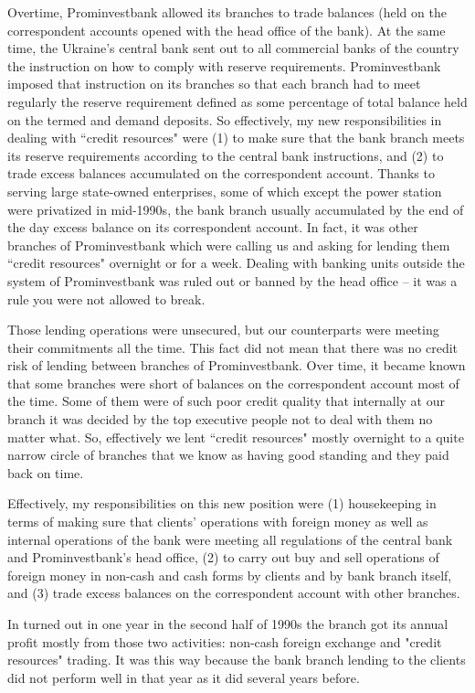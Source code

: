 Overtime, Prominvestbank allowed its branches to trade balances (held on the correspondent accounts opened with the head office of the bank). At the same time, the Ukraine's central bank sent out to all commercial banks of the country the instruction on how to comply with reserve requirements. Prominvestbank imposed that instruction on its branches so that each branch had to meet regularly the reserve requirement defined as some percentage of total balance held on the termed and demand deposits. So effectively, my new responsibilities in dealing with ``credit resources" were (1) to make sure that the bank branch meets its reserve requirements according to the central bank instructions, and (2) to trade excess balances accumulated on the correspondent account. Thanks to serving large state-owned enterprises, some of which except the power station were privatized in mid-1990s, the bank branch usually accumulated by the end of the day excess balance on its correspondent account. In fact, it was other branches of Prominvestbank which were calling us and asking for lending them ``credit resources" overnight or for a week. Dealing with banking units outside the system of Prominvestbank was ruled out or banned by the head office -- it was a rule you were not allowed to break. 

Those lending operations were unsecured, but our counterparts were meeting their commitments all the time. This fact did not mean that there was no credit risk of lending between branches of Prominvestbank. Over time, it became known that some branches were short of balances on the correspondent account most of the time. Some of them were of such poor credit quality that internally at our branch it was decided by the top executive people not to deal with them no matter what. So, effectively we lent ``credit resources" mostly overnight to a quite narrow circle of branches that we know as having good standing and they paid back on time.

Effectively, my responsibilities on this new position were (1) housekeeping in terms of making sure that clients' operations with foreign money as well as internal operations of the bank were meeting all regulations of the central bank and Prominvestbank's head office, (2) to carry out buy and sell operations of foreign money in non-cash and cash forms by clients and by bank branch itself, and (3) trade excess balances on the correspondent account with other branches. 

In turned out in one year in the second half of 1990s the branch got its annual profit mostly from those two activities: non-cash foreign exchange and "credit resources" trading. It was this way because the bank branch lending to the clients did not perform well in that year as it did several years before.

